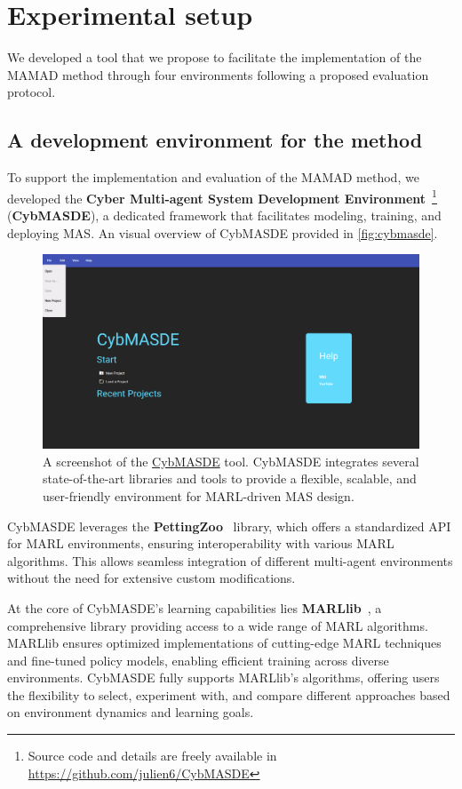 \documentclass[pdflatex,sn-mathphys-num]{sn-jnl}%
\theoremstyle{thmstyleone}%
\theoremstyle{thmstyletwo}%
\theoremstyle{thmstylethree}%
\begin{document}
\section{Experimental setup}
\label{sec:experimental_setup}

We developed a tool that we propose to facilitate the implementation of the MAMAD method through four environments following a proposed evaluation protocol.

\subsection{A development environment for the method}

To support the implementation and evaluation of the MAMAD method, we developed the \textbf{Cyber Multi-agent System Development Environment}~\footnote{Source code and details are freely available in \url{https://github.com/julien6/CybMASDE}} (\textbf{CybMASDE}), a dedicated framework that facilitates modeling, training, and deploying MAS. An visual overview of CybMASDE provided in \autoref{fig:cybmasde}.

\begin{figure}[h!]
    \centering
    \includegraphics[width=0.7\linewidth]{figures/CybMASDE.png}
    \caption{A screenshot of the \href{https://github.com/julien6/CybMASDE}{CybMASDE} tool. CybMASDE integrates several state-of-the-art libraries and tools to provide a flexible, scalable, and user-friendly environment for MARL-driven MAS design.}
    \label{fig:cybmasde}
\end{figure}


CybMASDE leverages the \textbf{PettingZoo}~\cite{Terry2021} library, which offers a standardized API for MARL environments, ensuring interoperability with various MARL algorithms. This allows seamless integration of different multi-agent environments without the need for extensive custom modifications.

At the core of CybMASDE's learning capabilities lies \textbf{MARLlib}~\cite{hu2022marllib}, a comprehensive library providing access to a wide range of MARL algorithms. MARLlib ensures optimized implementations of cutting-edge MARL techniques and fine-tuned policy models, enabling efficient training across diverse environments. CybMASDE fully supports MARLlib's algorithms, offering users the flexibility to select, experiment with, and compare different approaches based on environment dynamics and learning goals.
\end{document}

